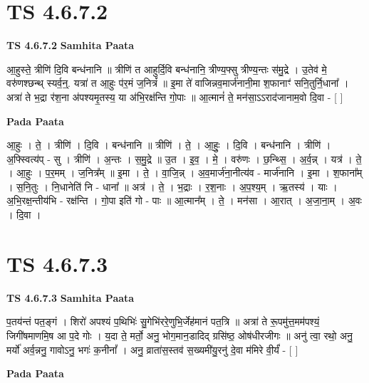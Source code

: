 \documentclass[17pt]{extarticle}
\begin{document}
\section{ TS 4.6.7.2 }

\textbf{TS 4.6.7.2 } \newline
\textbf{Samhita Paata} \newline

आ॒हुस्ते॒ त्रीणि॑ दि॒वि बन्ध॑नानि ॥ त्रीणि॑ त आहुर्दि॒वि बन्ध॑नानि॒ त्रीण्य॒फ्सु त्रीण्य॒न्तः स॑मु॒द्रे । उ॒तेव॑ मे॒ वरु॑णश्छन्थ् स्यर्व॒न्॒. यत्रा॑ त आ॒हुः प॑र॒मं ज॒नित्रं᳚ ॥ इ॒मा ते॑ वाजिन्नव॒मार्ज॑नानी॒मा श॒फानाꣳ॑ सनि॒तुर्नि॒धाना᳚ । अत्रा॑ ते भ॒द्रा र॑श॒ना अ॑पश्यमृ॒तस्य॒ या अ॑भि॒रक्ष॑न्ति गो॒पाः ॥ आ॒त्मानं॑ ते॒ मन॑सा॒ऽऽराद॑जानाम॒वो दि॒वा - [  ] \newline

\textbf{Pada Paata} \newline

आ॒हुः । ते॒ । त्रीणि॑ । दि॒वि । बन्ध॑नानि ॥ त्रीणि॑ । ते॒ । आ॒हुः॒ । दि॒वि । बन्ध॑नानि । त्रीणि॑ । अ॒फ्स्वित्य॑प् - सु । त्रीणि॑ । अ॒न्तः । स॒मु॒द्रे ॥ उ॒त । इ॒व॒ । मे॒ । वरु॑णः । छ॒न्थ्सि॒ । अ॒र्व॒न्न् । यत्र॑ । ते॒ । आ॒हुः । प॒र॒मम् । ज॒नित्र᳚म् ॥ इ॒मा । ते॒ । वा॒जि॒न्न् । अ॒व॒मार्ज॑ना॒नीत्य॑व - मार्ज॑नानि । इ॒मा । श॒फाना᳚म् । स॒नि॒तुः । नि॒धानेति॑ नि - धाना᳚ ॥ अत्र॑ । ते॒ । भ॒द्राः । र॒श॒नाः । अ॒प॒श्य॒म् । ऋ॒तस्य॑ । याः । अ॒भि॒रक्ष॒न्तीय॑भि - रक्ष॑न्ति । गो॒पा इति॑ गो - पाः ॥ आ॒त्मान᳚म् । ते॒ । मन॑सा । आ॒रात् । अ॒जा॒ना॒म् । अ॒वः । दि॒वा ।  \newline





\section{ TS 4.6.7.3 }

\textbf{TS 4.6.7.3 } \newline
\textbf{Samhita Paata} \newline

प॒तय॑न्तं पत॒ङ्गं । शिरो॑ अपश्यं प॒थिभिः॑ सु॒गेभि॑ररे॒णुभि॒र्जेह॑मानं पत॒त्रि ॥ अत्रा॑ ते रू॒पमु॑त्त॒मम॑पश्यं॒ जिगी॑षमाणमि॒ष आ प॒दे गोः । य॒दा ते॒ मर्तो॒ अनु॒ भोग॒मान॒डादिद् ग्रसि॑ष्ठ॒ ओष॑धीरजीगः ॥ अनु॑ त्वा॒ रथो॒ अनु॒ मर्यो॑ अर्व॒न्ननु॒ गावोऽनु॒ भगः॑ क॒नीनां᳚ । अनु॒ व्राता॑स॒स्तव॑ स॒ख्यमी॑यु॒रनु॑ दे॒वा म॑मिरे वी॒र्यं॑ - [  ] \newline

\textbf{Pada Paata} \newline
\end{document}
